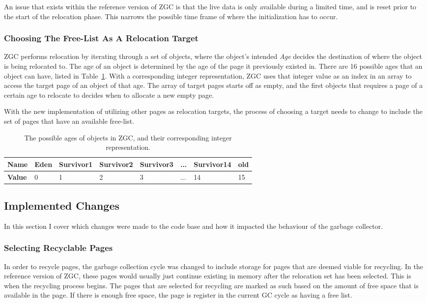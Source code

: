 An issue that exists within the reference version of ZGC is that the live data is only available during a limited time, and is reset prior to the start of the relocation phase. This narrows the possible time frame of where the initialization has to occur. 

\subsubsection{Choosing The Free-List As A Relocation Target}
\label{sec:analyse-use}

ZGC performs relocation by iterating through a set of objects, where the object's intended \textit{Age} decides the destination of where the object is being relocated to. The age of an object is determined by the age of the page it previously existed in. There are 16 possible ages that an object can have, listed in Table~\ref{table:zpage_ages}. With a corresponding integer representation, ZGC uses that integer value as an index in an array to access the target page of an object of that age. 
The array of target pages starts off as empty, and the first objects that requires a page of a certain age to relocate to decides when to allocate a new empty page. 

With the new implementation of utilizing other pages as relocation targets, the process of choosing a target needs to change to include the set of pages that have an available free-list. 


\begin{table}[H]
\centering
\begin{tabular}{|l|l|l|l|l|l|l|l|}
    \hline
    \textbf{Name} & Eden & Survivor1 & Survivor2 & Survivor3 & ... & Survivor14 & old \\ \hline
    \textbf{Value} & 0 & 1 & 2 & 3 & ... & 14 & 15 \\ \hline
\end{tabular}
\caption{The possible ages of objects in ZGC, and their corresponding integer representation.}
\label{table:zpage_ages}
\end{table}

\subsection{Implemented Changes}
In this section I cover which changes were made to the code base and how it impacted the behaviour of the garbage collector.
\subsubsection{Selecting Recyclable Pages}
\label{sec:implement-select}
In order to recycle pages, the garbage collection cycle was changed to include storage for pages that are deemed viable for recycling. In the reference version of ZGC, these pages would usually just continue existing in memory after the relocation set has been selected. This is when the recycling process begins. The pages that are selected for recycling are marked as such based on the amount of free space that is available in the page. If there is enough free space, the page is register in the current GC cycle as having a free list. 

